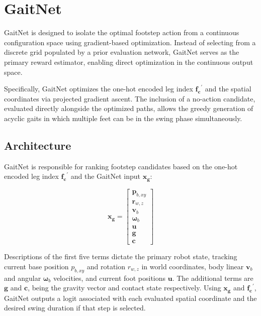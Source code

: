 \section{GaitNet}
\label{sec:methodology-gaitnet}

GaitNet is designed to isolate the optimal footstep action from a
continuous configuration space using gradient-based optimization. 
Instead of selecting from a discrete grid populated by a prior evaluation 
network, GaitNet serves as the primary reward estimator, enabling direct 
optimization in the continuous output space.

Specifically, GaitNet optimizes the one-hot encoded leg index $\mathbf{f_c}^{\prime}$ 
and the spatial coordinates via projected gradient ascent. The inclusion of a 
no-action candidate, evaluated directly alongside the optimized paths, 
allows the greedy generation of acyclic gaits in which multiple feet 
can be in the swing phase simultaneously.

\subsection{Architecture}
\label{subsec:methodology-gaitnet-architecture}

GaitNet is responsible for ranking footstep candidates based on the
one-hot encoded leg index $\mathbf{f_c}^{\prime}$ and the GaitNet
input $\mathbf{x_g}$:

\begin{equation}
  \mathbf{x_g} =
  \begin{bmatrix}
    \mathbf p_{b,xy} \\
    \mathbf r_{w,z} \\
    \mathbf v_b \\
    \mathbf \omega_b \\
    \mathbf u \\
    \mathbf g \\
    \mathbf c
  \end{bmatrix}
  \label{eq:gaitnet-x}
\end{equation}

Descriptions of the first five terms dictate the primary robot state, tracking current 
base position $p_{b,xy}$ and rotation $r_{w,z}$ in world coordinates, body linear 
$\mathbf v_b$ and angular $\mathbf \omega_b$ velocities, and current foot positions $\mathbf u$. 
The additional terms are $\mathbf g$ and $\mathbf c$, being the gravity vector and contact state 
respectively. Using $\mathbf{x_g}$ and $\mathbf{f_c}^{\prime}$, GaitNet outputs a logit associated with
each evaluated spatial coordinate and the desired swing duration if that step is selected.

